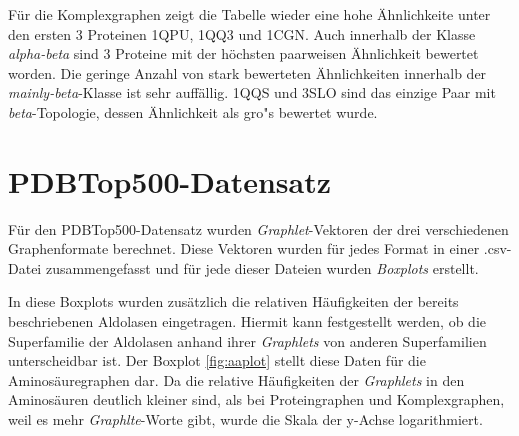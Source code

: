\documentclass{report}
\begin{document}
F\"ur die Komplexgraphen zeigt die Tabelle wieder eine hohe \"Ahnlichkeite unter den ersten 3 Proteinen 1QPU, 1QQ3 und 1CGN. Auch innerhalb der Klasse \textit{alpha-beta} sind 3 Proteine mit der h\"ochsten paarweisen \"Ahnlichkeit bewertet worden. Die geringe Anzahl von stark bewerteten \"Ahnlichkeiten innerhalb der \textit{mainly-beta}-Klasse ist sehr auff\"allig. 1QQS und 3SLO sind das einzige Paar mit \textit{beta}-Topologie, dessen \"Ahnlichkeit als gro"s bewertet wurde.


\section{PDBTop500-Datensatz}

F\"ur den PDBTop500-Datensatz wurden \textit{Graphlet}-Vektoren der drei verschiedenen Graphenformate berechnet. Diese Vektoren wurden f\"ur jedes Format in einer .csv-Datei zusammengefasst und f\"ur jede dieser Dateien wurden \textit{Boxplots} erstellt.

In diese Boxplots wurden zus\"atzlich die relativen H\"aufigkeiten der bereits beschriebenen Aldolasen eingetragen. Hiermit kann festgestellt werden, ob die Superfamilie der Aldolasen anhand ihrer \textit{Graphlets} von anderen Superfamilien unterscheidbar ist.
Der Boxplot \ref{fig:aaplot} stellt diese Daten f\"ur die Aminos\"auregraphen dar. Da die relative H\"aufigkeiten der \textit{Graphlets} in den Aminos\"auren deutlich kleiner sind, als bei Proteingraphen und Komplexgraphen, weil es mehr \textit{Graphlte}-Worte gibt, wurde die Skala der y-Achse logarithmiert.
\end{document}
